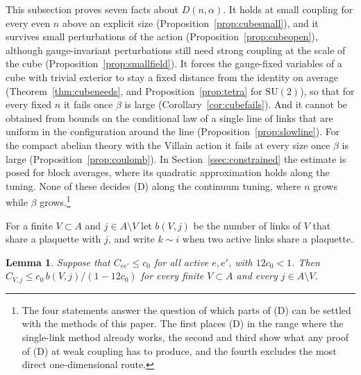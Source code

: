 \documentclass[11pt]{amsart}
\newtheorem{lemma}[theorem]{Lemma}
\theoremstyle{definition}
\theoremstyle{remark}
\numberwithin{equation}{section}
\newcommand{\SU}{\mathrm{SU}}
\begin{document}
This subsection proves seven facts about $D(n,\alpha)$. It holds at small
coupling for every even $n$ above an explicit size
(Proposition~\ref{prop:cubesmall}), and it survives small perturbations of
the action (Proposition~\ref{prop:cubeopen}), although gauge-invariant
perturbations still need strong coupling at the scale of the cube
(Proposition~\ref{prop:smallfield}). It forces the gauge-fixed variables of a
cube with trivial exterior to stay a fixed distance from the identity on
average (Theorem~\ref{thm:cubeneeds}, and Proposition~\ref{prop:tetra} for
$\SU(2)$), so that for every fixed $n$ it fails
once $\beta$ is large (Corollary~\ref{cor:cubefails}). And it cannot be
obtained from bounds on the conditional law of a single line of links that
are uniform in the configuration around the line
(Proposition~\ref{prop:slowline}). For the compact abelian theory with
the Villain action it fails at every size once $\beta$ is large
(Proposition~\ref{prop:coulomb}). In Section~\ref{ssec:constrained} the
estimate is posed for block averages, where its quadratic approximation
holds along the tuning. None of these decides (D) along the
continuum tuning, where $n$ grows while $\beta$ grows.\footnote{The four
statements answer the question of which parts of (D) can be settled with
the methods of this paper. The first places (D) in the range where the
single-link method already works, the second and third show what any proof
of (D) at weak coupling has to produce, and the fourth excludes the most
direct one-dimensional route. }

For a finite $V\subset A$ and $j\in A\setminus V$ let $b(V,j)$ be the number
of links of $V$ that share a plaquette with $j$, and write $k\sim i$ when two
active links share a plaquette.

\begin{lemma}\label{lem:cubesingle}
Suppose that $C_{ee'}\le c_0$ for all active $e,e'$, with $12c_0<1$. Then
$C_{V,j}\le c_0\,b(V,j)/(1-12c_0)$ for every finite $V\subset A$ and every
$j\in A\setminus V$.
\end{lemma}
\end{document}
